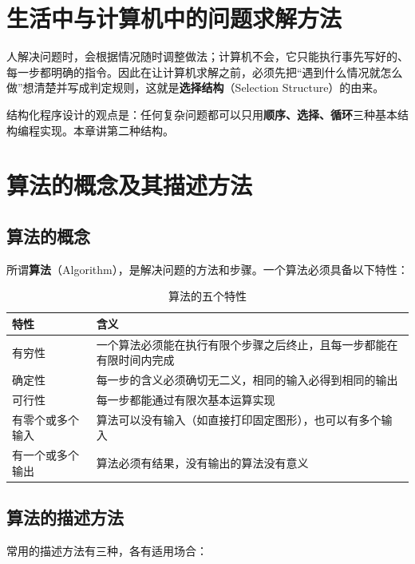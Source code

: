 ﻿%
\lstset{language=C}

\section{生活中与计算机中的问题求解方法}

人解决问题时，会根据情况随时调整做法；计算机不会，它只能执行事先写好的、每一步都明确的指令。因此在让计算机求解之前，必须先把“遇到什么情况就怎么做”想清楚并写成判定规则，这就是\textbf{选择结构}（Selection Structure）的由来。

结构化程序设计的观点是：任何复杂问题都可以只用\textbf{顺序、选择、循环}三种基本结构编程实现。本章讲第二种结构。

\section{算法的概念及其描述方法}

\subsection{算法的概念}

所谓\textbf{算法}（Algorithm），是解决问题的方法和步骤。一个算法必须具备以下特性：

\begin{table}[htbp]
\centering
\caption{算法的五个特性}
\small
\begin{tabularx}{\textwidth}{@{}lX@{}}
\toprule
特性 & 含义 \\
\midrule
有穷性 & 一个算法必须能在执行有限个步骤之后终止，且每一步都能在有限时间内完成 \\
确定性 & 每一步的含义必须确切无二义，相同的输入必得到相同的输出 \\
可行性 & 每一步都能通过有限次基本运算实现 \\
有零个或多个输入 & 算法可以没有输入（如直接打印固定图形），也可以有多个输入 \\
有一个或多个输出 & 算法必须有结果，没有输出的算法没有意义 \\
\bottomrule
\end{tabularx}
\end{table}

\subsection{算法的描述方法}

常用的描述方法有三种，各有适用场合：

